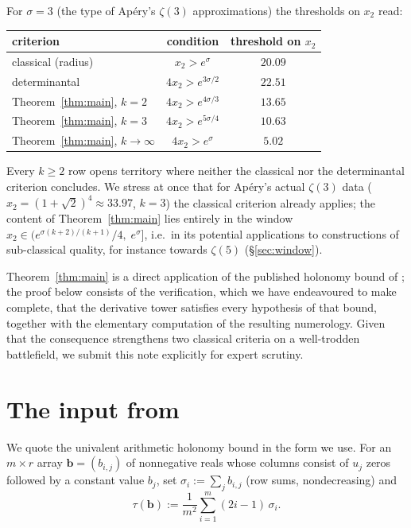 \documentclass[11pt]{amsart}
\theoremstyle{definition}
\theoremstyle{remark}
\begin{document}
For $\sigma=3$ (the type of Ap\'ery's $\zeta(3)$ approximations) the
thresholds on $x_2$ read:
\begin{center}
\begin{tabular}{lcc}
\toprule
criterion & condition & threshold on $x_2$\\
\midrule
classical (radius) & $x_2>e^{\sigma}$ & $20.09$\\
determinantal \cite{Zudilin} & $4x_2>e^{3\sigma/2}$ & $22.51$\\
Theorem~\ref{thm:main}, $k=2$ & $4x_2>e^{4\sigma/3}$ & $13.65$\\
Theorem~\ref{thm:main}, $k=3$ & $4x_2>e^{5\sigma/4}$ & $10.63$\\
Theorem~\ref{thm:main}, $k\to\infty$ & $4x_2>e^{\sigma}$ & $5.02$\\
\bottomrule
\end{tabular}
\end{center}
Every $k\ge2$ row opens territory where neither the classical nor the
determinantal criterion concludes. We stress at once that for Ap\'ery's
actual $\zeta(3)$ data ($x_2=(1+\sqrt2)^4\approx 33.97$, $k=3$) the
classical criterion already applies; the content of
Theorem~\ref{thm:main} lies entirely in the window
$x_2\in\bigl(e^{\sigma(k+2)/(k+1)}/4,\;e^{\sigma}\bigr]$, i.e.\ in its
potential applications to constructions of sub-classical quality, for
instance towards $\zeta(5)$ (\S\ref{sec:window}).

Theorem~\ref{thm:main} is a direct application of the published
holonomy bound of \cite{CDT}; the proof below consists of the
verification, which we have endeavoured to make complete, that the
derivative tower satisfies every hypothesis of that bound, together
with the elementary computation of the resulting numerology. Given that
the consequence strengthens two classical criteria on a well-trodden
battlefield, we submit this note explicitly for expert scrutiny.

\section{The input from \cite{CDT}}

We quote the univalent arithmetic holonomy bound in the form we use.
For an $m\times r$ array $\mathbf b=(b_{i,j})$ of nonnegative reals
whose columns consist of $u_j$ zeros followed by a constant value
$b_j$, set $\sigma_i:=\sum_j b_{i,j}$ (row sums, nondecreasing) and
\[
\tau(\mathbf b):=\frac1{m^2}\sum_{i=1}^m(2i-1)\,\sigma_i.
\]
\end{document}

